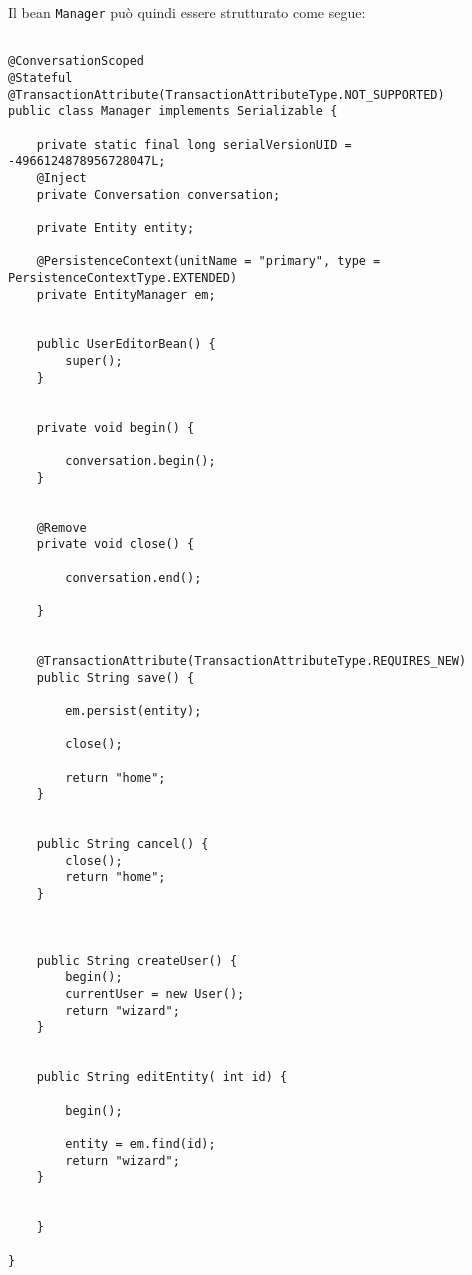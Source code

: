 Il bean \texttt{Manager} può quindi essere strutturato come segue:

\begin{lstlisting}
 
@ConversationScoped
@Stateful
@TransactionAttribute(TransactionAttributeType.NOT_SUPPORTED)
public class Manager implements Serializable {

	private static final long serialVersionUID = -4966124878956728047L;
	@Inject
	private Conversation conversation;

	private Entity entity;

	@PersistenceContext(unitName = "primary", type = PersistenceContextType.EXTENDED)
	private EntityManager em;


	public UserEditorBean() {
		super();
	}


	private void begin() {

		conversation.begin();
	}


	@Remove
	private void close() {

		conversation.end();

	}


	@TransactionAttribute(TransactionAttributeType.REQUIRES_NEW)
	public String save() {
		
		em.persist(entity);
		
		close();

		return "home";
	}


	public String cancel() {
		close();
		return "home";
	}


	
	public String createUser() {
		begin();
		currentUser = new User();
		return "wizard";
	}


	public String editEntity( int id) {

		begin();

		entity = em.find(id);
		return "wizard";
	}


	}

}
\end{lstlisting}




